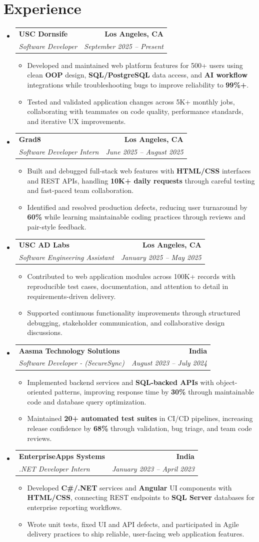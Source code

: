 \documentclass[letterpaper,10pt]{article}
\makeatletter
\newcommand{\resumeItem}[1]{\item\small{{#1 \vspace{-2pt}}}}
\newcommand{\resumeSubheading}[4]{\vspace{-1pt}\item\begin{tabular*}{1.0\textwidth}[t]{l@{\extracolsep{\fill}}r}\textbf{#1} & \textbf{\small #2} \\\textit{\small#3} & \textit{\small #4} \\\end{tabular*}\vspace{-2pt}}
\newcommand{\resumeSubHeadingListStart}{\begin{itemize}[leftmargin=0.0in, label={}]}
\newcommand{\resumeSubHeadingListEnd}{\end{itemize}}
\newcommand{\resumeItemListStart}{\begin{itemize}[leftmargin=0.15in,label=\textbullet,itemsep=2pt,topsep=0pt,parsep=0pt,partopsep=0pt]}
\newcommand{\resumeItemListEnd}{\end{itemize}\vspace{-4pt}}
\makeatother
\begin{document}
\section{Experience}
\resumeSubHeadingListStart
\resumeSubheading{USC Dornsife}{Los Angeles, CA}{Software Developer}{September 2025 -- Present}
\resumeItemListStart
\resumeItem{Developed and maintained web platform features for 500+ users using clean \textbf{OOP} design, \textbf{SQL/PostgreSQL} data access, and \textbf{AI workflow} integrations while troubleshooting bugs to improve reliability to \textbf{99\%+}.}
\resumeItem{Tested and validated application changes across 5K+ monthly jobs, collaborating with teammates on code quality, performance standards, and iterative UX improvements.}
\resumeItemListEnd
\resumeSubheading{Grad8}{Los Angeles, CA}{Software Developer Intern}{June 2025 -- August 2025}
\resumeItemListStart
\resumeItem{Built and debugged full-stack web features with \textbf{HTML/CSS} interfaces and REST APIs, handling \textbf{10K+ daily requests} through careful testing and fast-paced team collaboration.}
\resumeItem{Identified and resolved production defects, reducing user turnaround by \textbf{60\%} while learning maintainable coding practices through reviews and pair-style feedback.}
\resumeItemListEnd
\resumeSubheading{USC AD Labs}{Los Angeles, CA}{Software Engineering Assistant}{January 2025 -- May 2025}
\resumeItemListStart
\resumeItem{Contributed to web application modules across 100K+ records with reproducible test cases, documentation, and attention to detail in requirements-driven delivery.}
\resumeItem{Supported continuous functionality improvements through structured debugging, stakeholder communication, and collaborative design discussions.}
\resumeItemListEnd
\resumeSubheading{Aasma Technology Solutions}{India}{Software Developer - (SecureSync)}{August 2023 -- July 2024}
\resumeItemListStart
\resumeItem{Implemented backend services and \textbf{SQL-backed APIs} with object-oriented patterns, improving response time by \textbf{30\%} through maintainable code and database query optimization.}
\resumeItem{Maintained \textbf{20+ automated test suites} in CI/CD pipelines, increasing release confidence by \textbf{68\%} through validation, bug triage, and team code reviews.}
\resumeItemListEnd
\resumeSubheading{EnterpriseApps Systems}{India}{.NET Developer Intern}{January 2023 -- April 2023}
\resumeItemListStart
\resumeItem{Developed \textbf{C\#/.NET} services and \textbf{Angular} UI components with \textbf{HTML/CSS}, connecting REST endpoints to \textbf{SQL Server} databases for enterprise reporting workflows.}
\resumeItem{Wrote unit tests, fixed UI and API defects, and participated in Agile delivery practices to ship reliable, user-facing web application features.}
\resumeItemListEnd
\resumeSubHeadingListEnd
\vspace{-14pt}
\end{document}
